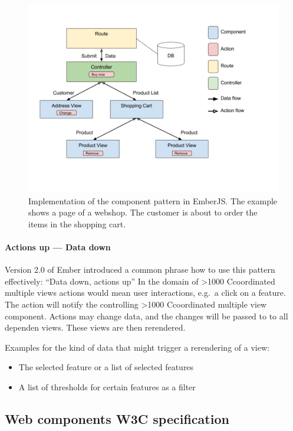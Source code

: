 \documentclass{article}
\newcommand\hmm[1]{\ifnum\ifhmode\spacefactor\else2000\fi>1000 \uppercase{#1}\else#1\fi}
\newcommand{\cmv}{\hmm{c}oordinated multiple view}
\newcommand{\cmvs}{\hmm{c}oordinated multiple views}
\begin{document}
\begin{figure}[h!]
  \centering
  \includegraphics[width=\textwidth]{images/data-down-actions-up.png}
  \caption{%
    Implementation of the component pattern in EmberJS\@.
    The example shows a page of a webshop.
    The customer is about to order the items in the shopping cart.
  }\label{fig:implementation:data-down-actions-up}
\end{figure}

\paragraph{Actions up --- Data down}

Version 2.0 of Ember introduced a common phrase how to use this pattern effectively: ``Data down, actions up''\cite{Emberigniter2017}
In the domain of \cmvs{} actions would mean user interactions, e.g.\ a click on a feature.
The action will notify the controlling \cmv{} component.
Actions may change data, and the changes will be passed to to all dependen views.
These views are then rerendered.

Examples for the kind of data that might trigger a rerendering of a view:
\begin{itemize}
  \item
    The selected feature or a list of selected features
  \item
    A list of thresholds for certain features as a filter
\end{itemize}

\subsection{Web components W3C specification}
\end{document}
